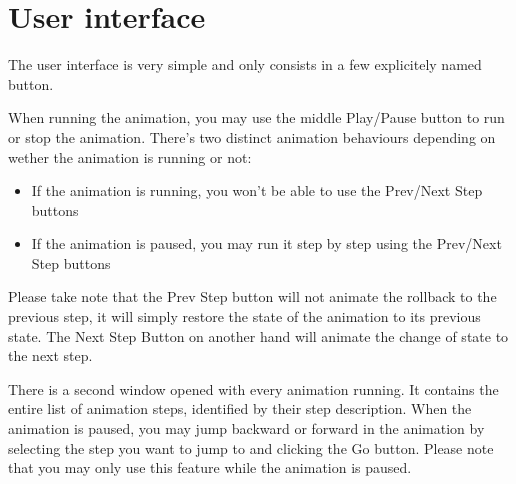 \documentclass{l3proj}
\begin{document}
\chapter{User interface}

The user interface is very simple and only consists in a few explicitely named button.



When running the animation, you may use the middle Play/Pause button to run or stop the animation. There's two distinct animation
behaviours depending on wether the animation is running or not:
\begin{itemize}
\item If the animation is running, you won't be able to use the Prev/Next Step buttons
\item If the animation is paused, you may run it step by step using the Prev/Next Step buttons
\end{itemize}

Please take note that the Prev Step button will not animate the rollback to the previous step, it will simply restore the state of the animation to its previous state.
The Next Step Button on another hand will animate the change of state to the next step.

There is a second window opened with every animation running. It contains the entire list of animation steps, identified by their step description. When the animation is paused,
you may jump backward or forward in the animation by selecting the step you want to jump to and clicking the Go button. 
Please note that you may only use this feature while the animation is paused.
\end{document}
